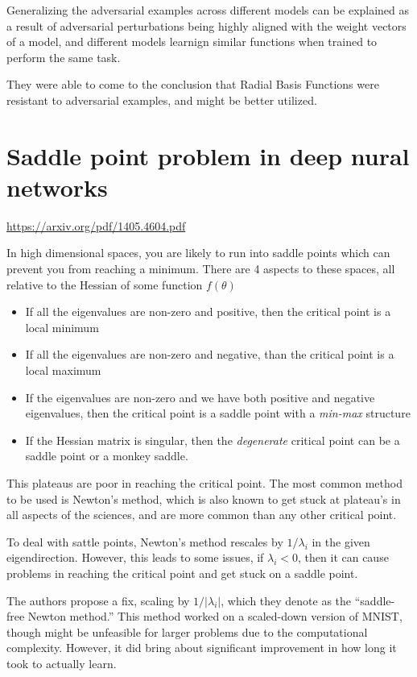 \documentclass[english,course]{Notes}
\begin{document}
Generalizing the adversarial examples across different models can be explained as a result of adversarial perturbations being highly aligned with the weight vectors of a model, and different models learnign similar functions when trained to perform the same task.

They were able to come to the conclusion that Radial Basis Functions were resistant to adversarial examples, and might be better utilized. 

\section{Saddle point problem in deep nural networks}

\url{https://arxiv.org/pdf/1405.4604.pdf}

In high dimensional spaces, you are likely to run into saddle points which can prevent you from reaching a minimum. There are 4 aspects to these spaces, all relative to the Hessian of some function $f(\theta)$

\begin{itemize}
  \item If all the eigenvalues are non-zero and positive, then the critical point is a local minimum
  \item If all the eigenvalues are non-zero and negative, than the critical point is a local maximum
  \item If the eigenvalues are non-zero and we have both positive and negative eigenvalues, then the critical point is a saddle point with a {\em min-max} structure
 \item If the Hessian matrix is singular, then the {\em degenerate} critical point can be a saddle point or a monkey saddle.
\end{itemize}

This plateaus are poor in reaching the critical point. The most common method to be used is Newton's method, which is also known to get stuck at plateau's in all aspects of the sciences, and are more common than any other critical point.

To deal with sattle points, Newton's method rescales by $1/\lambda_{i}$ in the given eigendirection. However, this leads to some issues, if $\lambda_{i}<0$, then it can cause problems in reaching the critical point and get stuck on a saddle point.

The authors propose a fix, scaling by $1/\left| \lambda_{i}\right|$, which they denote as the ``saddle-free Newton method.'' This method worked on a scaled-down version of MNIST, though might be unfeasible for larger problems due to the computational complexity. However, it did bring about significant improvement in how long it took to actually learn.
\end{document}
